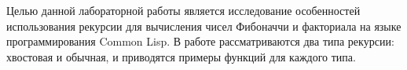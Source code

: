 
Целью данной лабораторной работы является исследование особенностей использования рекурсии для вычисления чисел Фибоначчи и факториала на языке программирования Common Lisp. В работе рассматриваются два типа рекурсии: хвостовая и обычная, и приводятся примеры функций для каждого типа.



\clearpage
